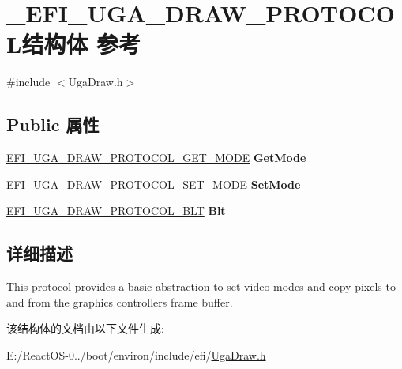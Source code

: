 \hypertarget{struct___e_f_i___u_g_a___d_r_a_w___p_r_o_t_o_c_o_l}{}\section{\+\_\+\+E\+F\+I\+\_\+\+U\+G\+A\+\_\+\+D\+R\+A\+W\+\_\+\+P\+R\+O\+T\+O\+C\+O\+L结构体 参考}
\label{struct___e_f_i___u_g_a___d_r_a_w___p_r_o_t_o_c_o_l}


{\ttfamily \#include $<$Uga\+Draw.\+h$>$}

\subsection*{Public 属性}
\begin{DoxyCompactItemize}
\item 
\mbox{\label{struct___e_f_i___u_g_a___d_r_a_w___p_r_o_t_o_c_o_l_ae53f10312b83ec6b604523fd8f8e3bc4}} 
\hyperlink{_uga_draw_8h_a7ec2cf92cf2daedc6b6be60b8e3b8ad6}{E\+F\+I\+\_\+\+U\+G\+A\+\_\+\+D\+R\+A\+W\+\_\+\+P\+R\+O\+T\+O\+C\+O\+L\+\_\+\+G\+E\+T\+\_\+\+M\+O\+DE} {\bfseries Get\+Mode}
\item 
\mbox{\label{struct___e_f_i___u_g_a___d_r_a_w___p_r_o_t_o_c_o_l_a1c8c4f07874d5281eaa6f30a237b0879}} 
\hyperlink{_uga_draw_8h_a2253d21bf433ed2a950354226150e155}{E\+F\+I\+\_\+\+U\+G\+A\+\_\+\+D\+R\+A\+W\+\_\+\+P\+R\+O\+T\+O\+C\+O\+L\+\_\+\+S\+E\+T\+\_\+\+M\+O\+DE} {\bfseries Set\+Mode}
\item 
\mbox{\label{struct___e_f_i___u_g_a___d_r_a_w___p_r_o_t_o_c_o_l_afe4a5f8889f772203c80f84d7fcdd317}} 
\hyperlink{_uga_draw_8h_a27bef6102cec9cc46a500a7a4325c91a}{E\+F\+I\+\_\+\+U\+G\+A\+\_\+\+D\+R\+A\+W\+\_\+\+P\+R\+O\+T\+O\+C\+O\+L\+\_\+\+B\+LT} {\bfseries Blt}
\end{DoxyCompactItemize}


\subsection{详细描述}
\hyperlink{namespace_this}{This} protocol provides a basic abstraction to set video modes and copy pixels to and from the graphics controller\textquotesingle{}s frame buffer. 

该结构体的文档由以下文件生成\+:\begin{DoxyCompactItemize}
\item 
E\+:/\+React\+O\+S-\/0../boot/environ/include/efi/\hyperlink{_uga_draw_8h}{Uga\+Draw.\+h}\end{DoxyCompactItemize}
